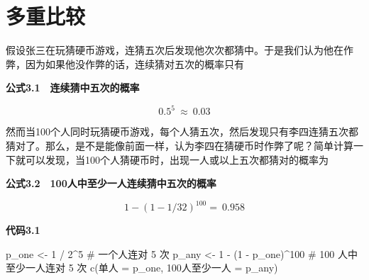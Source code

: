 \documentclass[
  chinese-hans,
  letterpaper,
  DIV=11,
  numbers=noendperiod]{scrreprt}
\newenvironment{Shaded}{\begin{snugshade}}{\end{snugshade}}
\newcommand{\AttributeTok}[1]{\textcolor[rgb]{0.40,0.45,0.13}{#1}}
\newcommand{\CommentTok}[1]{\textcolor[rgb]{0.37,0.37,0.37}{#1}}
\newcommand{\DecValTok}[1]{\textcolor[rgb]{0.68,0.00,0.00}{#1}}
\newcommand{\FunctionTok}[1]{\textcolor[rgb]{0.28,0.35,0.67}{#1}}
\newcommand{\NormalTok}[1]{\textcolor[rgb]{0.00,0.23,0.31}{#1}}
\newcommand{\OtherTok}[1]{\textcolor[rgb]{0.00,0.23,0.31}{#1}}
\newcommand{\SpecialCharTok}[1]{\textcolor[rgb]{0.37,0.37,0.37}{#1}}
\newcommand{\StringTok}[1]{\textcolor[rgb]{0.13,0.47,0.30}{#1}}
\begin{document}
\section{多重比较}\label{ux591aux91cdux6bd4ux8f83}

假设张三在玩猜硬币游戏，连猜五次后发现他次次都猜中。于是我们认为他在作弊，因为如果他没作弊的话，连续猜对五次的概率只有

\textbf{公式3.1　连续猜中五次的概率}

\[{0.5}^{5}\  \approx \ 0.03\]

然而当100个人同时玩猜硬币游戏，每个人猜五次，然后发现只有李四连猜五次都猜对了。那么，是不是能像前面一样，认为李四在猜硬币时作弊了呢？简单计算一下就可以发现，当100个人猜硬币时，出现一人或以上五次都猜对的概率为

\textbf{公式3.2　100人中至少一人连续猜中五次的概率}

\[1 - {(1 - 1/32)}^{100} = \ 0.958\]

\begin{tcolorbox}[enhanced jigsaw, arc=.35mm, bottomrule=.15mm, breakable, colback=white, colframe=quarto-callout-note-color-frame, left=2mm, leftrule=.75mm, opacityback=0, rightrule=.15mm, toprule=.15mm]

\vspace{-3mm}\textbf{代码3.1}\vspace{3mm}

\begin{Shaded}
\begin{Highlighting}[]
\NormalTok{p\_one }\OtherTok{\textless{}{-}} \DecValTok{1} \SpecialCharTok{/} \DecValTok{2}\SpecialCharTok{\^{}}\DecValTok{5}                 \CommentTok{\# 一个人连对 5 次}
\NormalTok{p\_any }\OtherTok{\textless{}{-}} \DecValTok{1} \SpecialCharTok{{-}}\NormalTok{ (}\DecValTok{1} \SpecialCharTok{{-}}\NormalTok{ p\_one)}\SpecialCharTok{\^{}}\DecValTok{100}     \CommentTok{\# 100 人中至少一人连对 5 次}
\FunctionTok{c}\NormalTok{(单人 }\OtherTok{=}\NormalTok{ p\_one, }\StringTok{\textasciigrave{}}\AttributeTok{100人至少一人}\StringTok{\textasciigrave{}} \OtherTok{=}\NormalTok{ p\_any)}
\end{Highlighting}
\end{Shaded}

\end{tcolorbox}
\end{document}
